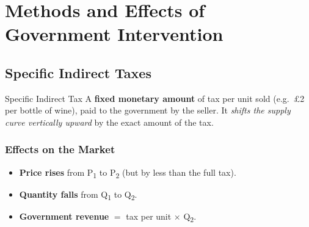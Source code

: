 \documentclass[11pt, a4paper, twoside]{book}
\begin{document}
\section{Methods and Effects of Government Intervention}

\subsection{Specific Indirect Taxes}

\begin{keyterm}{Specific Indirect Tax}
A \textbf{fixed monetary amount} of tax per unit sold (e.g.\ \pounds2 per bottle of wine), paid to the government by the seller. It \emph{shifts the supply curve vertically upward} by the exact amount of the tax.
\end{keyterm}

\subsubsection{Effects on the Market}

\begin{itemize}
  \item \textbf{Price rises} from P\textsubscript{1} to P\textsubscript{2} (but by less than the full tax).
  \item \textbf{Quantity falls} from Q\textsubscript{1} to Q\textsubscript{2}.
  \item \textbf{Government revenue} $=$ tax per unit $\times$ Q\textsubscript{2}.
\end{itemize}
\end{document}
